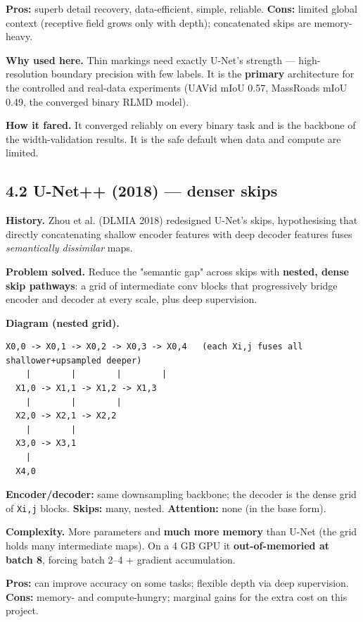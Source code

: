 \documentclass[11pt]{article}
\begin{document}
\textbf{Pros:} superb detail recovery, data-efficient, simple, reliable. \textbf{Cons:} limited global context (receptive field grows only with depth); concatenated skips are memory-heavy.

\textbf{Why used here.} Thin markings need exactly U-Net's strength --- high-resolution boundary precision with few labels. It is the \textbf{primary} architecture for the controlled and real-data experiments (UAVid mIoU 0.57, MassRoads mIoU 0.49, the converged binary RLMD model).

\textbf{How it fared.} It converged reliably on every binary task and is the backbone of the width-validation results. It is the safe default when data and compute are limited.

\subsection*{4.2 U-Net++ (2018) --- denser skips}

\textbf{History.} Zhou et al. (DLMIA 2018) redesigned U-Net's skips, hypothesising that directly concatenating shallow encoder features with deep decoder features fuses \textit{semantically dissimilar} maps.

\textbf{Problem solved.} Reduce the "semantic gap" across skips with \textbf{nested, dense skip pathways}: a grid of intermediate conv blocks that progressively bridge encoder and decoder at every scale, plus deep supervision.

\textbf{Diagram (nested grid).}
\begin{Verbatim}[breaklines=true,breakanywhere=true,fontsize=\footnotesize]
  X0,0 -> X0,1 -> X0,2 -> X0,3 -> X0,4   (each Xi,j fuses all shallower+upsampled deeper)
    |        |        |        |
  X1,0 -> X1,1 -> X1,2 -> X1,3
    |        |        |
  X2,0 -> X2,1 -> X2,2
    |        |
  X3,0 -> X3,1
    |
  X4,0
\end{Verbatim}

\textbf{Encoder/decoder:} same downsampling backbone; the decoder is the dense grid of \texttt{Xi,j} blocks. \textbf{Skips:} many, nested. \textbf{Attention:} none (in the base form).

\textbf{Complexity.} More parameters and \textbf{much more memory} than U-Net (the grid holds many intermediate maps). On a 4 GB GPU it \textbf{out-of-memoried at batch 8}, forcing batch 2--4 + gradient accumulation.

\textbf{Pros:} can improve accuracy on some tasks; flexible depth via deep supervision. \textbf{Cons:} memory- and compute-hungry; marginal gains for the extra cost on this project.
\end{document}
